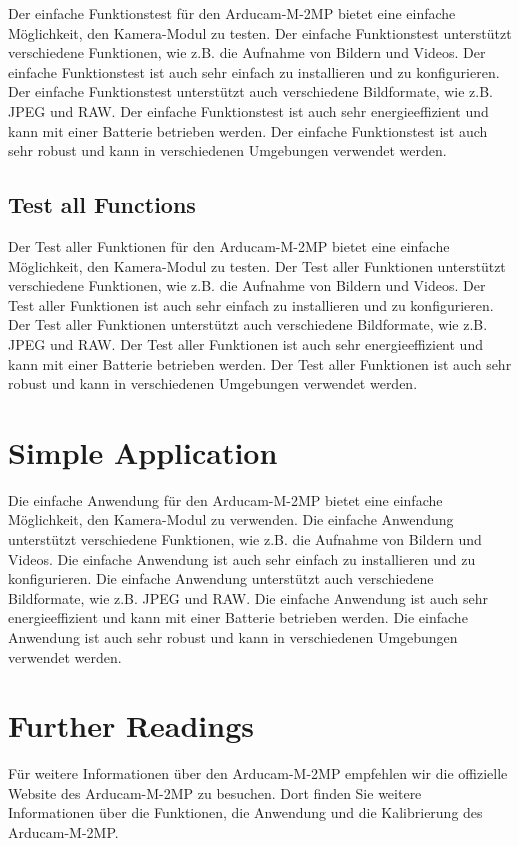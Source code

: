 Der einfache Funktionstest für den Arducam-M-2MP bietet eine einfache Möglichkeit, den Kamera-Modul zu testen. Der einfache Funktionstest unterstützt verschiedene Funktionen, wie z.B. die Aufnahme von Bildern und Videos. Der einfache Funktionstest ist auch sehr einfach zu installieren und zu konfigurieren. Der einfache Funktionstest unterstützt auch verschiedene Bildformate, wie z.B. JPEG und RAW. Der einfache Funktionstest ist auch sehr energieeffizient und kann mit einer Batterie betrieben werden. Der einfache Funktionstest ist auch sehr robust und kann in verschiedenen Umgebungen verwendet werden.

\subsection{Test all Functions}

Der Test aller Funktionen für den Arducam-M-2MP bietet eine einfache Möglichkeit, den Kamera-Modul zu testen. Der Test aller Funktionen unterstützt verschiedene Funktionen, wie z.B. die Aufnahme von Bildern und Videos. Der Test aller Funktionen ist auch sehr einfach zu installieren und zu konfigurieren. Der Test aller Funktionen unterstützt auch verschiedene Bildformate, wie z.B. JPEG und RAW. Der Test aller Funktionen ist auch sehr energieeffizient und kann mit einer Batterie betrieben werden. Der Test aller Funktionen ist auch sehr robust und kann in verschiedenen Umgebungen verwendet werden.

\section{Simple Application}

Die einfache Anwendung für den Arducam-M-2MP bietet eine einfache Möglichkeit, den Kamera-Modul zu verwenden. Die einfache Anwendung unterstützt verschiedene Funktionen, wie z.B. die Aufnahme von Bildern und Videos. Die einfache Anwendung ist auch sehr einfach zu installieren und zu konfigurieren. Die einfache Anwendung unterstützt auch verschiedene Bildformate, wie z.B. JPEG und RAW. Die einfache Anwendung ist auch sehr energieeffizient und kann mit einer Batterie betrieben werden. Die einfache Anwendung ist auch sehr robust und kann in verschiedenen Umgebungen verwendet werden.

\section{Further Readings}

Für weitere Informationen über den Arducam-M-2MP empfehlen wir die offizielle Website des Arducam-M-2MP zu besuchen. Dort finden Sie weitere Informationen über die Funktionen, die Anwendung und die Kalibrierung des Arducam-M-2MP.



